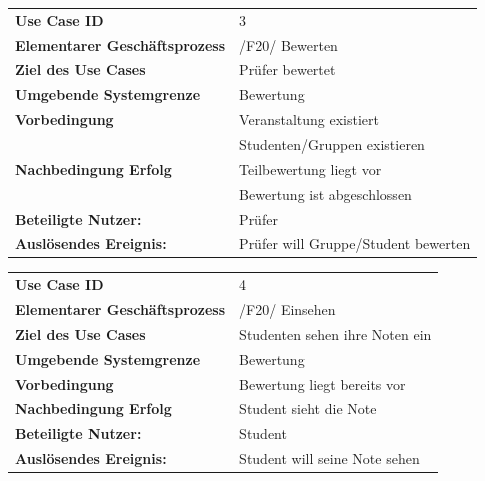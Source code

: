 	
			\begin{table}[ht!]
			\begin{tabular}{ll}
			 \textbf{Use Case ID} & 3 \\
		 	 \textbf{Elementarer Geschäftsprozess} & /F20/ Bewerten \\ 
			 \textbf{Ziel des Use Cases} & Prüfer bewertet  \\
			 \textbf{Umgebende Systemgrenze} & Bewertung \\ 
			 \textbf{Vorbedingung} & Veranstaltung existiert \\
			  					   & Studenten/Gruppen existieren \\ 
			 \textbf{Nachbedingung Erfolg} & Teilbewertung liegt vor \\
			 							   & Bewertung ist abgeschlossen\\
			 							    
			 \textbf{Beteiligte Nutzer:} & Prüfer \\ 
		     \textbf{Auslösendes Ereignis:} & Prüfer will Gruppe/Student bewerten \\ 
			 
			\end{tabular} 
			\label{tab:usecase_3}
			\end{table}
			
			\begin{table}[ht!]
			\begin{tabular}{ll}
			 \textbf{Use Case ID} & 4 \\
		 	 \textbf{Elementarer Geschäftsprozess} & /F20/ Einsehen \\ 
			 \textbf{Ziel des Use Cases} & Studenten sehen ihre Noten ein  \\
			 \textbf{Umgebende Systemgrenze} & Bewertung \\ 
			 \textbf{Vorbedingung} & Bewertung liegt bereits vor \\
			 \textbf{Nachbedingung Erfolg} & Student sieht die Note\\
			 			    
			 \textbf{Beteiligte Nutzer:} & Student \\ 
		     \textbf{Auslösendes Ereignis:} & Student will seine Note sehen\\ 
			 
			\end{tabular} 
			\label{tab:usecase_4}
			\end{table}
			
